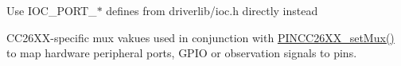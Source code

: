 
\begin{DoxyRefList}
\item[Module \mbox{\hyperlink{_p_i_n_c_c26_x_x_8h_amgrp121d71c3ee6f8843829e20de17505c6c}{Device-\/specific pin mux values for C\+C26xx family}} ]\label{deprecated__deprecated000001}%
%
Use I\+O\+C\+\_\+\+P\+O\+R\+T\+\_\+$\ast$ defines from driverlib/ioc.\+h directly instead

C\+C26\+X\+X-\/specific mux vakues used in conjunction with \mbox{\hyperlink{_p_i_n_c_c26_x_x_8c_ac8cbb649db80dd03d8e8a487aef43294}{P\+I\+N\+C\+C26\+X\+X\+\_\+set\+Mux()}} to map hardware peripheral ports, G\+P\+IO or observation signals to pins. 
\end{DoxyRefList}